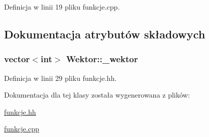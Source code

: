 \-Definicja w linii 19 pliku funkcje.\-cpp.



\subsection{\-Dokumentacja atrybutów składowych}
\hypertarget{class_wektor_a7f12c52f70d750eca2185d5d744f82e0}{
\subsubsection[{\-\_\-wektor}]{\setlength{\rightskip}{0pt plus 5cm}vector$<$int$>$ {\bf \-Wektor\-::\-\_\-wektor}}}\label{class_wektor_a7f12c52f70d750eca2185d5d744f82e0}


\-Definicja w linii 29 pliku funkcje.\-hh.



\-Dokumentacja dla tej klasy została wygenerowana z plików\-:\begin{DoxyCompactItemize}
\item 
\hyperlink{funkcje_8hh}{funkcje.\-hh}\item 
\hyperlink{funkcje_8cpp}{funkcje.\-cpp}\end{DoxyCompactItemize}
